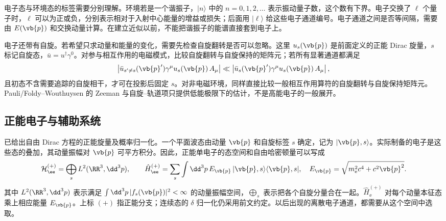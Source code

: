 电子态与环境态的标签需要分别理解。环境若是一个谐振子，$|n\rangle$ 中的 $n=0,1,2,\ldots$ 表示振动量子数，这个数有下界。电子交换了 $\ell$ 个量子时，$\ell$ 可以为正或负，分别表示相对于入射中心能量的增益或损失；后面用 $|\ell\rangle$ 给这些电子通道编号。电子通道之间是否等间隔，需要由 $E(\vb{p})$ 和交换动量计算。在建立近似以前，不能把谐振子的能谱直接套到电子上。

电子还带有自旋。若希望只求动量和能量的变化，需要先检查自旋翻转是否可以忽略。这里 $u_s(\vb{p})$ 是前面定义的正能 Dirac 旋量，$s$ 标记自旋态，$\bar u=u^\dagger\gamma^0$。对参与相互作用的电磁模式，比较自旋翻转与自旋保持的矩阵元；若所有显著通道都满足
\begin{equation*}
\left|\bar u_{s'\neq s}(\vb{p}')\gamma^\mu u_s(\vb{p})\,A_\mu\right|
\ll
\left|\bar u_s(\vb{p}')\gamma^\mu u_s(\vb{p})\,A_\mu\right|,
\end{equation*}
且初态不含需要追踪的自旋相干，才可在投影后固定 $s$。对非电磁环境，同样直接比较一般相互作用算符的自旋翻转与自旋保持矩阵元。Pauli/Foldy--Wouthuysen 的 Zeeman 与自旋--轨道项只提供低能极限下的估计，不是高能电子的一般展开。



\subsection{正能电子与辅助系统}

已给出自由 Dirac 方程的正能旋量及概率归一化。一个平面波态由动量 $\vb{p}$ 和自旋标签 $s$ 确定，记为 $|\vb{p},s\rangle$。实际制备的电子是这些态的叠加，其动量振幅对 $\vb{p}$ 可平方积分。因此，正能单电子的态空间和自由哈密顿量可以写成
\begin{equation}
{
\mathcal H_\ee^{(+)}
=\bigoplus_s L^2(\RR^3,\dd^3p),
\qquad
\hat H_\ee^{(+)}
=\sum_s\int\dd^3p\,
E_{\vb{p}}\,|\vb{p},s\rangle\langle\vb{p},s|,
\quad
E_{\vb{p}}=\sqrt{m_{\mathrm e}^2c^4+c^2\vb{p}^2}.}
\label{eq:free_electron_positive_continuum_mother}
\end{equation}
其中 $L^2(\RR^3,\dd^3p)$ 表示满足 $\int\dd^3p\,|f_s(\vb{p})|^2<\infty$ 的动量振幅空间，$\bigoplus_s$ 表示把各个自旋分量合在一起。$\hat H_\ee^{(+)}$ 对每个动量本征态乘上相应能量 $E_{\vb{p}}$。上标 $(+)$ 指正能分支；连续态的 $\delta$ 归一化仍采用前文约定。以后出现的离散电子通道，都需要从这个空间中选取。

